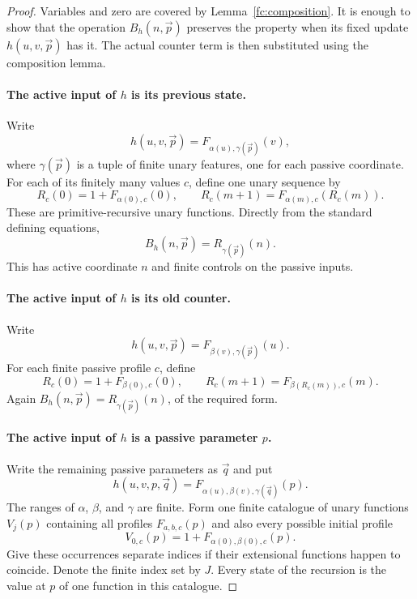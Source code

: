 \begin{proof}
Variables and zero are covered by Lemma~\ref{fc:composition}. It is
enough to show that the operation $B_h(n,\vec p)$ preserves the property
when its fixed update $h(u,v,\vec p)$ has it. The actual counter term
is then substituted using the composition lemma.

\paragraph{The active input of $h$ is its previous state.}
Write
\[
                 h(u,v,\vec p)=F_{\alpha(u),\gamma(\vec p)}(v),
\]
where $\gamma(\vec p)$ is a tuple of finite unary features, one for
each passive coordinate. For each of its finitely many values $c$, define
one unary sequence by
\[
 R_c(0)=1+F_{\alpha(0),c}(0),\qquad
 R_c(m+1)=F_{\alpha(m),c}(R_c(m)).
\]
These are primitive-recursive unary functions. Directly from the
standard defining equations,
\[
                      B_h(n,\vec p)=R_{\gamma(\vec p)}(n).
\]
This has active coordinate $n$ and finite controls on the passive inputs.

\paragraph{The active input of $h$ is its old counter.}
Write
\[
                 h(u,v,\vec p)=F_{\beta(v),\gamma(\vec p)}(u).
\]
For each finite passive profile $c$, define
\[
 R_c(0)=1+F_{\beta(0),c}(0),\qquad
 R_c(m+1)=F_{\beta(R_c(m)),c}(m).
\]
Again $B_h(n,\vec p)=R_{\gamma(\vec p)}(n)$, of the required form.

\paragraph{The active input of $h$ is a passive parameter $p$.}
Write the remaining passive parameters as $\vec q$ and put
\[
                 h(u,v,p,\vec q)
                    =F_{\alpha(u),\beta(v),\gamma(\vec q)}(p).
\]
The ranges of $\alpha$, $\beta$, and $\gamma$ are finite. Form one
finite catalogue of unary functions $V_j(p)$ containing all profiles
$F_{a,b,c}(p)$ and also every possible initial profile
\[
                    V_{0,c}(p)=1+F_{\alpha(0),\beta(0),c}(p).
\]
Give these occurrences separate indices if their extensional functions
happen to coincide. Denote the finite index set by $J$. Every state of
the recursion is the value at $p$ of one function in this catalogue.


\end{proof}
